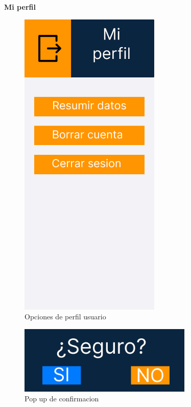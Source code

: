 \textbf{Mi perfil}

\begin{figure}[H]
   \centering
    \includegraphics[width=0.6\textwidth]{fotos/Frame 36.png}
    \caption{Opciones de perfil usuario}
    \label{fig:Opciones de perfil usuario}
\end{figure}
\begin{figure}[H]
   \centering
    \includegraphics[width=0.75\textwidth]{fotos/Frame 38.png}
    \caption{Pop up de confirmacion}
    \label{fig:Pop up de confirmacion}
\end{figure}
